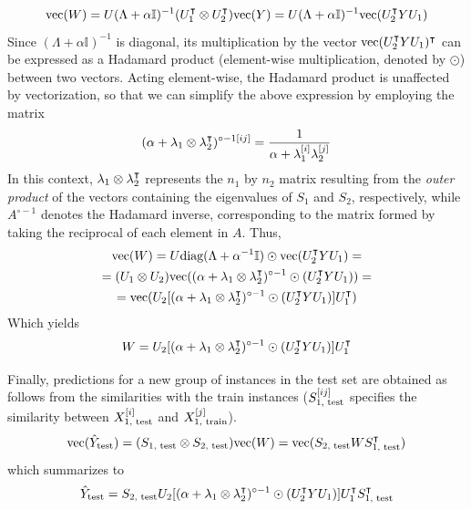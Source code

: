 %
\begin{equation*}
    \text{vec}(W)
    = U (\Lambda + \alpha\mathbb{I})^{-1} (U_1^\intercal \otimes U_2^\intercal) \text{vec}(Y)
    = U (\Lambda + \alpha\mathbb{I})^{-1} \text{vec}(U_2^\intercal Y U_1)
\end{equation*}
%
Since $(\Lambda + \alpha\mathbb{I})^{-1}$ is diagonal, its multiplication by the vector $\text{vec}(U_2^\intercal Y U_1)^\intercal$ can be expressed as a Hadamard product (element-wise multiplication, denoted by $\odot$) between two vectors. Acting element-wise, the Hadamard product is unaffected by vectorization, so that we can simplify the above expression by employing the matrix
%
\begin{equation}
    (\alpha + \mathbf{\lambda}_1 \otimes \mathbf{\lambda}_2^\intercal)^{\circ -1[ij]}
    = \frac{1}{\alpha + \mathbf{\lambda}_1^{[i]} \mathbf{\lambda}_2^{[j]}}
\end{equation}
%
In this context, $\mathbf{\lambda}_1 \otimes \mathbf{\lambda}_2^\intercal$ represents the $n_1$ by $n_2$ matrix resulting from the \emph{outer product} of the vectors containing the eigenvalues of $S_1$ and $S_2$, respectively, while $A^{\circ -1}$ denotes the Hadamard inverse, corresponding to the matrix formed by taking the reciprocal of each element in $A$. Thus,
%
\begin{multline*}
    \text{vec}(W)
    = U \text{diag}(\Lambda + \alpha^{-1}\mathbb{I}) \odot \text{vec}(U_2^\intercal Y U_1)
    =\\
    = (U_1 \otimes U_2) \text{vec}(
        (\alpha + \mathbf{\lambda}_1 \otimes \mathbf{\lambda}_2^\intercal)^{\circ -1}
        \odot (U_2^\intercal Y U_1)
    )
    =\\
    = \text{vec}(
        U_2
        [
            (\alpha + \mathbf{\lambda}_1 \otimes \mathbf{\lambda}_2^\intercal)^{\circ -1}
            \odot (U_2^\intercal Y U_1)
        ]
        U_1^\intercal
    )
\end{multline*}
%
Which yields
%
\begin{equation}
    W = 
        U_2
        [
            (\alpha + \mathbf{\lambda}_1 \otimes \mathbf{\lambda}_2^\intercal)^{\circ -1}
            \odot (U_2^\intercal Y U_1)
        ]
        U_1^\intercal
\end{equation}

Finally, predictions for a new group of instances in the test set are obtained as follows from the similarities with the train instances ($S_\text{1, test}^{[ij]}$ specifies the similarity between $X_\text{1, test}^{[i]}$ and $X_\text{1, train}^{[j]}$).
%
\begin{equation}
    \text{vec}(\hat Y_\text{test})
    = (S_\text{1, test} \otimes S_\text{2, test}) \text{vec}(W)
    = \text{vec}(S_\text{2, test} W S_\text{1, test}^\intercal)
\end{equation}
%
which summarizes to
%
\begin{equation}
    \hat Y_\text{test} =
        S_\text{2, test}
        U_2
        [
            (\alpha + \mathbf{\lambda}_1 \otimes \mathbf{\lambda}_2^\intercal)^{\circ -1}
            \odot (U_2^\intercal Y U_1)
        ]
        U_1^\intercal
        S_\text{1, test}^\intercal
\end{equation}

